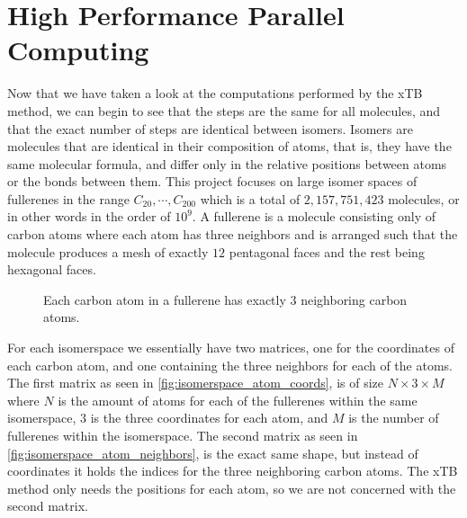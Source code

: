 
\section{High Performance Parallel Computing}\label{sec:hppc}

Now that we have taken a look at the computations performed by the xTB method, we can begin to see that the steps are the same for all molecules, and that the exact number of steps are identical between isomers. Isomers are molecules that are identical in their composition of atoms, that is, they have the same molecular formula, and differ only in the relative positions between atoms or the bonds between them.
This project focuses on large isomer spaces of fullerenes in the range \(C_{20}, \cdots, C_{200} \) which is a total of $2,157,751,423$ molecules, or in other words in the order of $10^9$. A fullerene is a molecule consisting only of carbon atoms where each atom has three neighbors and is arranged such that the molecule produces a mesh of exactly $12$ pentagonal faces and the rest being hexagonal faces.

\begin{figure}[H]
\centering
{}
\caption{Each carbon atom in a fullerene has exactly 3 neighboring carbon atoms.}
\label{fig:carbon-degree}
\end{figure}

For each isomerspace we essentially have two matrices, one for the coordinates of each carbon atom, and one containing the three neighbors for each of the atoms. The first matrix as seen in \autoref{fig:isomerspace_atom_coords}, is of size $N \times 3 \times M$ where $N$ is the amount of atoms for each of the fullerenes within the same isomerspace, $3$ is the three coordinates for each atom, and $M$ is the number of fullerenes within the isomerspace. The second matrix as seen in \autoref{fig:isomerspace_atom_neighbors}, is the exact same shape, but instead of coordinates it holds the indices for the three neighboring carbon atoms. The xTB method only needs the positions for each atom, so we are not concerned with the second matrix.

